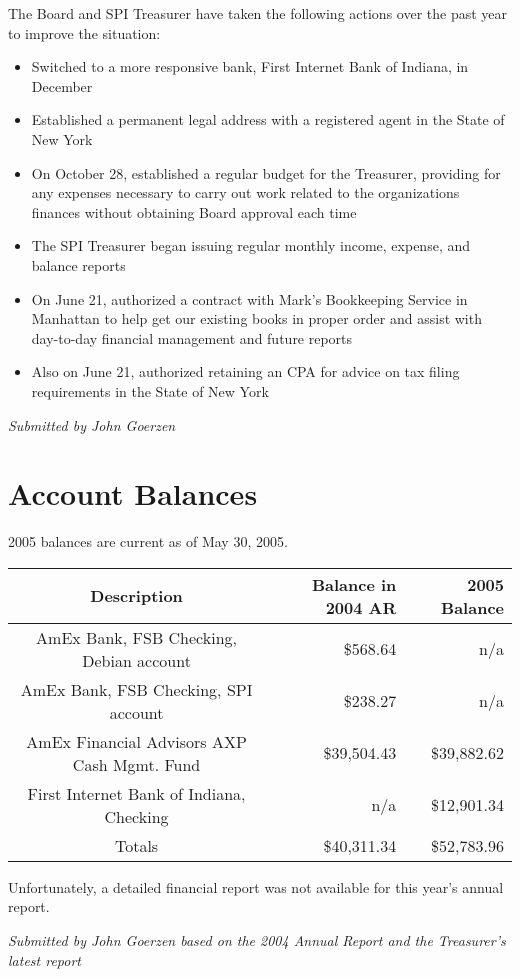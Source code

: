 \documentclass[letterpaper]{report}
\begin{document}
The Board and SPI Treasurer have taken the following actions over the past
year to improve the situation:

\begin{itemize}
\item Switched to a more responsive bank, First Internet Bank of Indiana, in December
\item Established a permanent legal address with a registered agent in the State of New York
\item On October 28, established a regular budget for the Treasurer, providing for any expenses necessary
to carry out work related to the organizations finances without obtaining Board approval each time
\item The SPI Treasurer began issuing regular monthly income, expense, and balance reports
\item On June 21, authorized a contract with Mark's Bookkeeping Service in Manhattan to help get our
existing books in proper order and assist with day-to-day financial management and future reports
\item Also on June 21, authorized retaining an CPA for advice on tax filing requirements in the State of New York
\end{itemize}

\emph{Submitted by John Goerzen}

\section{Account Balances}

2005 balances are current as of May 30, 2005.

\begin{tabular}{|c|r|r|}

\hline
Description & Balance in 2004 AR & 2005 Balance \tabularnewline
\hline
\hline
AmEx Bank, FSB Checking, Debian account & \$568.64 & n/a \tabularnewline
\hline
AmEx Bank, FSB Checking, SPI account & \$238.27 & n/a \tabularnewline
\hline
AmEx Financial Advisors AXP Cash Mgmt. Fund & \$39,504.43 & \$39,882.62 \tabularnewline
\hline
First Internet Bank of Indiana, Checking & n/a & \$12,901.34 \tabularnewline
\hline
Totals & \$40,311.34 & \$52,783.96 \tabularnewline
\hline

\end{tabular}

Unfortunately, a detailed financial report was not available for this
year's annual report.

\emph{Submitted by John Goerzen based on the 2004 Annual Report and the
Treasurer's latest report}
\end{document}
